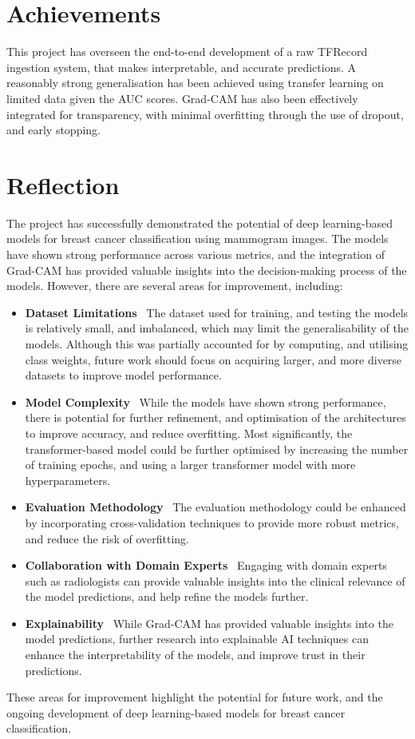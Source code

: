 \documentclass[../main]{subfiles}
\begin{document}
\clearpage

\section{Achievements}
This project has overseen the end-to-end development of a raw TFRecord ingestion system, that makes interpretable, and accurate predictions. A reasonably strong generalisation has been achieved using transfer learning on limited data given the AUC scores. Grad-CAM has also been effectively integrated for transparency, with minimal overfitting through the use of dropout, and early stopping.

\section{Reflection}
\label{sec:reflection}
The project has successfully demonstrated the potential of deep learning-based models for breast cancer classification using mammogram images. The models have shown strong performance across various metrics, and the integration of Grad-CAM has provided valuable insights into the decision-making process of the models. However, there are several areas for improvement, including:
\begin{itemize}
    \item \textbf{Dataset Limitations} \textemdash\ The dataset used for training, and testing the models is relatively small, and imbalanced, which may limit the generalisability of the models. Although this was partially accounted for by computing, and utilising class weights, future work should focus on acquiring larger, and more diverse datasets to improve model performance.
    \item \textbf{Model Complexity} \textemdash\ While the models have shown strong performance, there is potential for further refinement, and optimisation of the architectures to improve accuracy, and reduce overfitting. Most significantly, the transformer-based model could be further optimised by increasing the number of training epochs, and using a larger transformer model with more hyperparameters.
    \item \textbf{Evaluation Methodology} \textemdash\ The evaluation methodology could be enhanced by incorporating cross-validation techniques to provide more robust metrics, and reduce the risk of overfitting.
    \item \textbf{Collaboration with Domain Experts} \textemdash\ Engaging with domain experts such as radiologists can provide valuable insights into the clinical relevance of the model predictions, and help refine the models further.
    \item \textbf{Explainability} \textemdash\ While Grad-CAM has provided valuable insights into the model predictions, further research into explainable AI techniques can enhance the interpretability of the models, and improve trust in their predictions.
\end{itemize}
These areas for improvement highlight the potential for future work, and the ongoing development of deep learning-based models for breast cancer classification.
\end{document}
